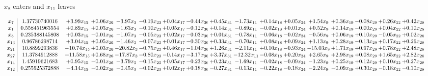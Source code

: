 \documentclass[9pt]{article}
\begin{document}
 $ x_{8} $ enters and $ x_{11} $ leaves 

 \[\begin{array}{c| c c@{\hskip 2pt} c@{\hskip 2pt} c@{\hskip 2pt} c@{\hskip 2pt} c@{\hskip 2pt} c@{\hskip 2pt} c@{\hskip 2pt} c@{\hskip 2pt} c@{\hskip 2pt} c@{\hskip 2pt} c@{\hskip 2pt} c@{\hskip 2pt} c@{\hskip 2pt} c@{\hskip 2pt} c@{\hskip 2pt} }
 x_{7}   &  1.37730740016 & +  3.99 x_{15} & +  0.06 x_{26} & -3.97 x_{3} & -0.19 x_{23} & +  0.04 x_{17} & -0.44 x_{30} & +  0.45 x_{31} & -1.73 x_{11} & +  0.14 x_{18} & +  0.05 x_{24} & +  1.54 x_{9} & +  0.36 x_{19} & -0.08 x_{29} & +  0.26 x_{22} & +  0.42 x_{28}\\
 x_{1}   &  0.558451963554 & +  0.89 x_{15} & +  0.03 x_{26} & -1.63 x_{3} & -0.10 x_{23} & +  0.05 x_{17} & -0.12 x_{30} & +  0.14 x_{31} & -0.89 x_{11} & -0.02 x_{18} & +  0.01 x_{24} & +  0.52 x_{9} & +  0.14 x_{19} & -0.00 x_{29} & +  0.04 x_{22} & +  0.10 x_{28}\\
 x_{8}   &  0.235388145808 & +  0.03 x_{15} & -0.01 x_{26} & -1.07 x_{3} & -0.05 x_{23} & +  0.02 x_{17} & -0.03 x_{30} & +  0.01 x_{31} & -0.78 x_{11} & -0.06 x_{18} & -0.02 x_{24} & -0.56 x_{9} & +  0.06 x_{19} & +  0.10 x_{29} & -0.05 x_{22} & +  0.02 x_{28}\\
 x_{13}   &  0.96786298714 & +  3.04 x_{15} & +  0.05 x_{26} & -1.46 x_{3} & -0.07 x_{23} & +  0.01 x_{17} & -0.30 x_{30} & +  0.33 x_{31} & -0.70 x_{11} & +  0.08 x_{18} & +  0.09 x_{24} & +  1.13 x_{9} & +  0.28 x_{19} & -0.13 x_{29} & +  0.17 x_{22} & +  0.26 x_{28}\\
 x_{21}   &  10.8899293836 & -10.74 x_{15} & +  0.03 x_{26} & -20.82 x_{3} & -0.75 x_{23} & +  0.46 x_{17} & -1.04 x_{30} & +  1.26 x_{31} & -2.11 x_{11} & +  0.10 x_{18} & -0.93 x_{24} & -15.03 x_{9} & +  1.71 x_{19} & +  0.97 x_{29} & +  0.78 x_{22} & +  2.48 x_{28}\\
 x_{27}   &  11.3784912888 & + 11.58 x_{15} & +  0.68 x_{26} & -17.87 x_{3} & -0.80 x_{23} & -0.14 x_{17} & -3.17 x_{30} & +  3.37 x_{31} & -12.32 x_{11} & -0.08 x_{18} & +  0.20 x_{24} & +  2.65 x_{9} & +  2.98 x_{19} & +  0.08 x_{29} & +  1.65 x_{22} & +  2.82 x_{28}\\
 x_{14}   &  1.45919621683 & +  0.95 x_{15} & -0.01 x_{26} & -3.79 x_{3} & -0.15 x_{23} & +  0.05 x_{17} & -0.23 x_{30} & +  0.23 x_{31} & -1.69 x_{11} & -0.02 x_{18} & -0.09 x_{24} & -1.23 x_{9} & +  0.25 x_{19} & +  0.12 x_{29} & +  0.10 x_{22} & +  0.27 x_{28}\\
 x_{12}   &  0.255625372888 & -4.14 x_{15} & -0.02 x_{26} & -0.45 x_{3} & -0.02 x_{23} & +  0.02 x_{17} & +  0.18 x_{30} & -0.27 x_{31} & -0.13 x_{11} & -0.22 x_{18} & -0.18 x_{24} & -2.24 x_{9} & -0.09 x_{19} & +  0.30 x_{29} & -0.18 x_{22} & -0.10 x_{28}\\

\end{array}\]
\end{document}
